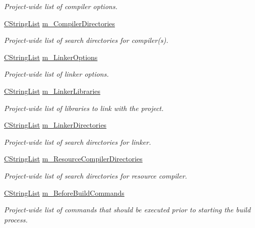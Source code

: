\begin{DoxyCompactItemize}
\begin{DoxyCompactList}\small\item\em Project-\/wide list of compiler options. \end{DoxyCompactList}\item 
\hyperlink{classCStringList}{C\-String\-List} \hyperlink{classCCodeBlocksProject_a64dfc22099c2b4456d401627bb7d23ee}{m\-\_\-\-Compiler\-Directories}
\begin{DoxyCompactList}\small\item\em Project-\/wide list of search directories for compiler(s). \end{DoxyCompactList}\item 
\hyperlink{classCStringList}{C\-String\-List} \hyperlink{classCCodeBlocksProject_a0267339a7092c081a8a4f953a44f488e}{m\-\_\-\-Linker\-Options}
\begin{DoxyCompactList}\small\item\em Project-\/wide list of linker options. \end{DoxyCompactList}\item 
\hyperlink{classCStringList}{C\-String\-List} \hyperlink{classCCodeBlocksProject_af731d75a45cfe7adf484cd1033c5940d}{m\-\_\-\-Linker\-Libraries}
\begin{DoxyCompactList}\small\item\em Project-\/wide list of libraries to link with the project. \end{DoxyCompactList}\item 
\hyperlink{classCStringList}{C\-String\-List} \hyperlink{classCCodeBlocksProject_a16cac351f48df53ca7c1e5c072983e3a}{m\-\_\-\-Linker\-Directories}
\begin{DoxyCompactList}\small\item\em Project-\/wide list of search directories for linker. \end{DoxyCompactList}\item 
\hyperlink{classCStringList}{C\-String\-List} \hyperlink{classCCodeBlocksProject_aebc2c851c4ee0779cbeefff19a723b07}{m\-\_\-\-Resource\-Compiler\-Directories}
\begin{DoxyCompactList}\small\item\em Project-\/wide list of search directories for resource compiler. \end{DoxyCompactList}\item 
\hyperlink{classCStringList}{C\-String\-List} \hyperlink{classCCodeBlocksProject_aefda434d2b3f3b58ae91041e5832f9d0}{m\-\_\-\-Before\-Build\-Commands}
\begin{DoxyCompactList}\small\item\em Project-\/wide list of commands that should be executed prior to starting the build process. \end{DoxyCompactList}\item 

\end{DoxyCompactItemize}
